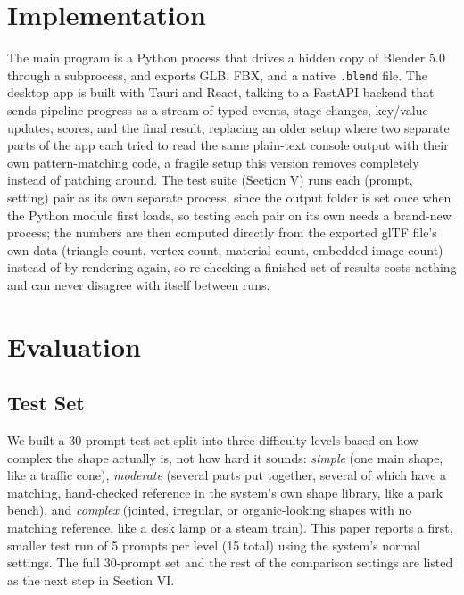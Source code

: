\documentclass[conference]{IEEEtran}
\begin{document}
\section{Implementation}
The main program is a Python process that drives a hidden copy of Blender 5.0 through a subprocess, and exports GLB, FBX, and a native \texttt{.blend} file. The desktop app is built with Tauri and React, talking to a FastAPI backend that sends pipeline progress as a stream of typed events, stage changes, key/value updates, scores, and the final result, replacing an older setup where two separate parts of the app each tried to read the same plain-text console output with their own pattern-matching code, a fragile setup this version removes completely instead of patching around. The test suite (Section V) runs each (prompt, setting) pair as its own separate process, since the output folder is set once when the Python module first loads, so testing each pair on its own needs a brand-new process; the numbers are then computed directly from the exported glTF file's own data (triangle count, vertex count, material count, embedded image count) instead of by rendering again, so re-checking a finished set of results costs nothing and can never disagree with itself between runs.

\section{Evaluation}
\label{sec:eval}

\subsection{Test Set}
We built a 30-prompt test set split into three difficulty levels based on how complex the shape actually is, not how hard it sounds: \emph{simple} (one main shape, like a traffic cone), \emph{moderate} (several parts put together, several of which have a matching, hand-checked reference in the system's own shape library, like a park bench), and \emph{complex} (jointed, irregular, or organic-looking shapes with no matching reference, like a desk lamp or a steam train). This paper reports a first, smaller test run of 5 prompts per level (15 total) using the system's normal settings. The full 30-prompt set and the rest of the comparison settings are listed as the next step in Section VI.
\end{document}
